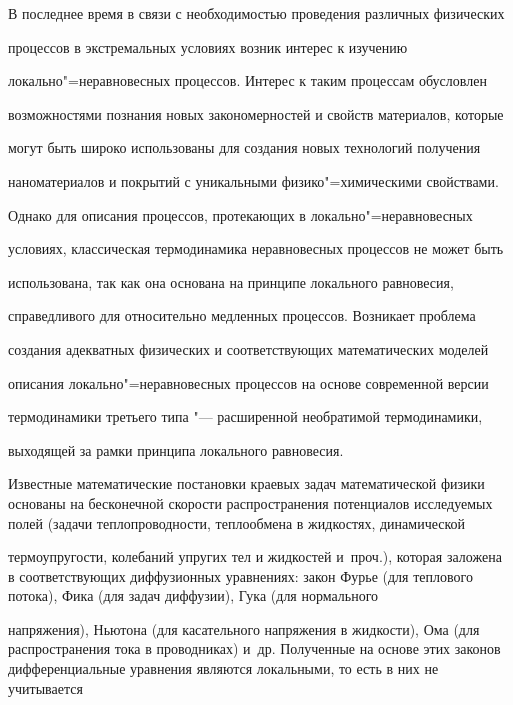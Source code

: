 В последнее время в связи с необходимостью проведения различных физических

процессов в экстремальных условиях возник интерес к изучению

локально"=неравновесных процессов. Интерес к таким процессам обусловлен

возможностями познания новых закономерностей и свойств материалов, которые

могут быть широко использованы для создания новых технологий получения

наноматериалов и покрытий с уникальными физико"=химическими свойствами.

Однако для описания процессов, протекающих в локально"=неравновесных

условиях, классическая термодинамика неравновесных процессов не может быть

использована, так как она основана на принципе локального равновесия,

справедливого для относительно медленных процессов. Возникает проблема

создания адекватных физических и соответствующих математических моделей

описания локально"=неравновесных процессов на основе современной версии

термодинамики третьего типа "--- расширенной необратимой термодинамики,

выходящей за рамки принципа локального равновесия. %



\smallskip




Известные математические постановки краевых задач математической физики основаны на бесконечной скорости распространения потенциалов исследуемых полей (задачи теплопроводности, теплообмена в жидкостях, динамической

термоупругости, колебаний упругих тел и жидкостей и~проч.), которая заложена в соответствующих диффузионных уравнениях: закон Фурье (для теплового потока), Фика (для задач диффузии), Гука (для нормального

напряжения), Ньютона (для касательного напряжения в жидкости), Ома (для распространения тока в проводниках) и~др. Полученные на основе этих законов дифференциальные уравнения являются локальными, то есть в них не учитывается

